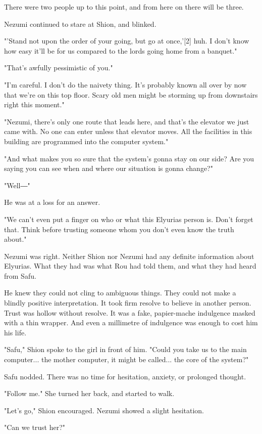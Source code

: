 There were two people up to this point, and from here on there will be
three.

Nezumi continued to stare at Shion, and blinked.

"'Stand not upon the order of your going, but go at once,'{[}2{]} huh. I
don't know how easy it'll be for us compared to the lords going home
from a banquet."

"That's awfully pessimistic of you."

"I'm careful. I don't do the naivety thing. It's probably known all over
by now that we're on this top floor. Scary old men might be storming up
from downstairs right this moment."

"Nezumi, there's only one route that leads here, and that's the elevator
we just came with. No one can enter unless that elevator moves. All the
facilities in this building are programmed into the computer system."

"And what makes you so sure that the system's gonna stay on our side?
Are you saying you can see when and where our situation is gonna
change?"

"Well―"

He was at a loss for an answer.

"We can't even put a finger on who or what this Elyurias person is.
Don't forget that. Think before trusting someone whom you don't even
know the truth about."

Nezumi was right. Neither Shion nor Nezumi had any definite information
about Elyurias. What they had was what Rou had told them, and what they
had heard from Safu.

He knew they could not cling to ambiguous things. They could not make a
blindly positive interpretation. It took firm resolve to believe in
another person. Trust was hollow without resolve. It was a fake,
papier-mache indulgence masked with a thin wrapper. And even a
millimetre of indulgence was enough to cost him his life.

"Safu," Shion spoke to the girl in front of him. "Could you take us to
the main computer... the mother computer, it might be called... the core
of the system?"

Safu nodded. There was no time for hesitation, anxiety, or prolonged
thought.

"Follow me." She turned her back, and started to walk.

"Let's go," Shion encouraged. Nezumi showed a slight hesitation.

"Can we trust her?"

